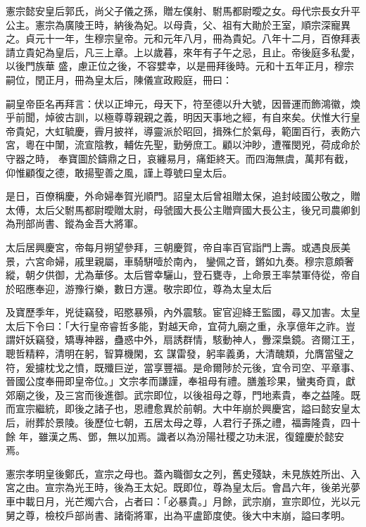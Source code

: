 \begin{pinyinscope}
 憲宗懿安皇后郭氏，尚父子儀之孫，贈左僕射、駙馬都尉曖之女。母代宗長女升平公主。憲宗為廣陵王時，納後為妃。以母貴，父、祖有大勛於王室，順宗深寵異之。貞元十一年，生穆宗皇帝。元和元年八月，冊為貴妃。八年十二月，百僚拜表請立貴妃為皇后，凡三上章。上以歲暮，來年有子午之忌，且止。帝後庭多私愛，以後門族華
 盛，慮正位之後，不容嬖幸，以是冊拜後時。元和十五年正月，穆宗嗣位，閏正月，冊為皇太后，陳儀宣政殿庭，冊曰：



 嗣皇帝臣名再拜言：伏以正坤元，母天下，符至德以升大號，因晉運而飾鴻徽，煥乎前聞，焯彼古訓，以極尊尊親親之義，明因天事地之經，有自來矣。伏惟大行皇帝貴妃，大虹毓慶，霽月披祥，導靈派於昭回，揖殊仁於氣母，範圍百行，表飭六宮，粵在中闈，流宣陰教，輔佐先聖，勤勞庶工。顧以沖眇，遭罹閔兇，荷成命於守器之時，
 奉寶圖於鑄鼎之日，哀纏易月，痛鉅終天。而四海無虞，萬邦有截，仰惟顧復之德，敢揚聖善之風，謹上尊號曰皇太后。



 是日，百僚稱慶，外命婦奉賀光順門。詔皇太后曾祖贈太保，追封岐國公敬之，贈太傅，太后父駙馬都尉曖贈太尉，母虢國大長公主贈齊國大長公主，後兄司農卿釗為刑部尚書、鏦為金吾大將軍。



 太后居興慶宮，帝每月朔望參拜，三朝慶賀，帝自率百官詣門上壽。或遇良辰美景，六宮命婦，戚里親屬，車騎駢噎於南內，
 鑾佩之音，鏘如九奏。穆宗意頗奢縱，朝夕供御，尤為華侈。太后嘗幸驪山，登石甕寺，上命景王率禁軍侍從，帝自於昭應奉迎，游豫行樂，數日方還。敬宗即位，尊為太皇太后



 及寶歷季年，兇徒竊發，昭愍暴殞，內外震駭。宦官迎絳王監國，尋又加害。太皇太后下令曰：「大行皇帝睿哲多能，對越天命，宜荷九廟之重，永享億年之祚。豈謂奸妖竊發，矯專神器，蠱惑中外，扇誘群情，駭動神人，釁深梟鏡。咨爾江王，聰哲精粹，清明在躬，智算機閑，玄
 謀雷發，躬率義勇，大清醜類，允膺當璧之符，爰攄枕戈之憤，既殲巨逆，當享豐福。是命爾陟於元後，宜令司空、平章事、晉國公度奉冊即皇帝位。」文宗孝而謙謹，奉祖母有禮。膳羞珍果，蠻夷奇貢，獻郊廟之後，及三宮而後進御。武宗即位，以後祖母之尊，門地素貴，奉之益隆。既而宣宗繼統，即後之諸子也，恩禮愈異於前朝。大中年崩於興慶宮，謚曰懿安皇太后，祔葬於景陵。後歷位七朝，五居太母之尊，人君行子孫之禮，福壽隆貴，四十餘
 年，雖漢之馬、鄧，無以加焉。識者以為汾陽社稷之功未泯，復鐘慶於懿安焉。



 憲宗孝明皇後鄭氏，宣宗之母也。蓋內職御女之列，舊史殘缺，未見族姓所出、入宮之由。宣宗為光王時，後為王太妃。既即位，尊為皇太后。會昌六年，後弟光夢車中載日月，光芒燭六合，占者曰：「必暴貴。」月餘，武宗崩，宣宗即位，光以元舅之尊，檢校戶部尚書、諸衛將軍，出為平盧節度使。後大中末崩，謚曰孝明。




\end{pinyinscope}
